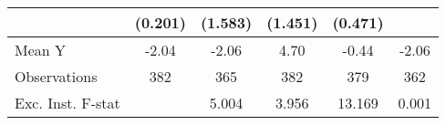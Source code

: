 {\begin{tabular}{l*{5}{c}}
            &     (0.201)         &     (1.583)         &     (1.451)         &     (0.471)         &                     \\
\midrule
Mean Y      &       -2.04         &       -2.06         &        4.70         &       -0.44         &       -2.06         \\
Observations&         382         &         365         &         382         &         379         &         362         \\
Exc. Inst. F-stat&                     &       5.004         &       3.956         &      13.169         &       0.001         \\
\bottomrule
\end{tabular}
}

